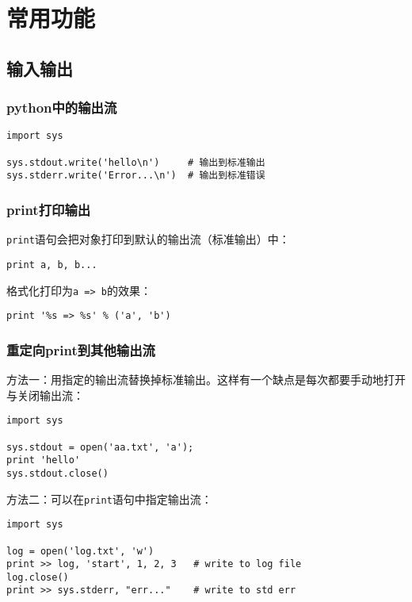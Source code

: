 
\chapter{常用功能}

	\section{输入输出}

		\subsection{python中的输出流}

\begin{lstlisting}
import sys

sys.stdout.write('hello\n')     # 输出到标准输出
sys.stderr.write('Error...\n')  # 输出到标准错误
\end{lstlisting}


		\subsection{print打印输出}

			\verb|print|语句会把对象打印到默认的输出流（标准输出）中：

\begin{lstlisting}
print a, b, b...
\end{lstlisting}

			格式化打印为\verb|a => b|的效果：

\begin{lstlisting}
print '%s => %s' % ('a', 'b')
\end{lstlisting}

		\subsection{重定向print到其他输出流}
		
			方法一：用指定的输出流替换掉标准输出。这样有一个缺点是每次都要手动地打开与关闭输出流：
\begin{lstlisting}
import sys

sys.stdout = open('aa.txt', 'a');
print 'hello'
sys.stdout.close()
\end{lstlisting}

			方法二：可以在\verb|print|语句中指定输出流：
\begin{lstlisting}
import sys

log = open('log.txt', 'w')
print >> log, 'start', 1, 2, 3   # write to log file
log.close()
print >> sys.stderr, "err..."    # write to std err
\end{lstlisting}

